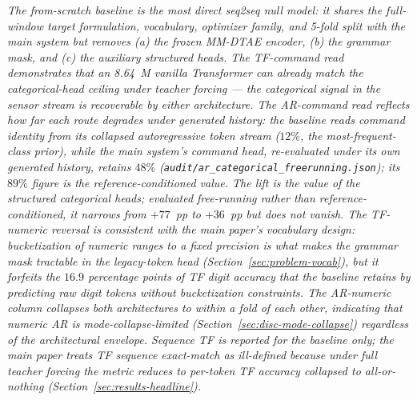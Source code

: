 \begin{table}[!htbp]
{\begin{tabular}{l r r r r r r}
\bottomrule
\end{tabular}%
}
\par\smallskip
\footnotesize\textit{The from-scratch baseline is the most direct seq2seq null model: it shares the full-window target formulation, vocabulary, optimizer family, and 5-fold split with the main system but removes (a) the frozen MM-DTAE encoder, (b) the grammar mask, and (c) the auxiliary structured heads. The TF-command read demonstrates that an 8.64~M vanilla Transformer can already match the categorical-head ceiling under teacher forcing --- the categorical signal in the sensor stream is recoverable by either architecture. The AR-command read reflects how far each route degrades under generated history: the baseline reads command identity from its collapsed autoregressive token stream ($12\%$, the most-frequent-class prior), while the main system's command head, re-evaluated under its own generated history, retains $48\%$ (\texttt{audit/ar\_categorical\_freerunning.json}); its $89\%$ figure is the reference-conditioned value. The lift is the value of the structured categorical heads; evaluated free-running rather than reference-conditioned, it narrows from $+77$~pp to $+36$~pp but does not vanish. The TF-numeric reversal is consistent with the main paper's vocabulary design: bucketization of numeric ranges to a fixed precision is what makes the grammar mask tractable in the legacy-token head (Section~\ref{sec:problem-vocab}), but it forfeits the $16.9$ percentage points of TF digit accuracy that the baseline retains by predicting raw digit tokens without bucketization constraints. The AR-numeric column collapses both architectures to within a fold of each other, indicating that numeric AR is mode-collapse-limited (Section~\ref{sec:disc-mode-collapse}) regardless of the architectural envelope. Sequence TF is reported for the baseline only; the main paper treats TF sequence exact-match as ill-defined because under full teacher forcing the metric reduces to per-token TF accuracy collapsed to all-or-nothing (Section~\ref{sec:results-headline}).}
\end{table}
